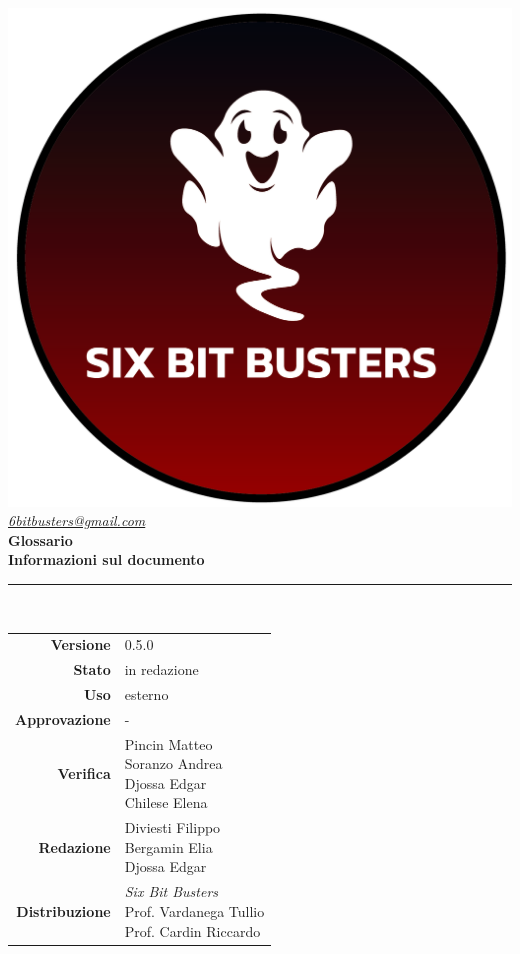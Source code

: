 \thispagestyle{empty}
\renewcommand{\arraystretch}{1.3}


\begin{titlepage}
	\begin{center}
		
	\includegraphics[scale = 0.7]{template/images/logo-circle.png}
	\\[1cm]
	\href{mailto:6bitbusters@gmail.com}		      	
	{\large{\textit{6bitbusters@gmail.com} } }\\[1cm]
	
	\Huge \textbf{Glossario} \\[1cm]

	\large \textbf{Informazioni sul documento} \\
	\rule{0.6\textwidth}{0.4pt}
	\\[0.5cm]
	\begin{tabular}{r|l}
		\textbf{Versione} & 0.5.0\\
		\textbf{Stato} & in redazione\\
		\textbf{Uso} & esterno\\                         
		\textbf{Approvazione} & -\\                      
		\textbf{Verifica} & \parbox[t]{5cm}{Pincin Matteo \\ Soranzo Andrea \\ Djossa Edgar \\Chilese Elena}\\                         
		\textbf{Redazione} & \parbox[t]{5cm}{Diviesti Filippo\\ Bergamin Elia \\ Djossa Edgar}\\
		\textbf{Distribuzione} & \parbox[t]{5cm}{ \textit{Six Bit Busters} \\ Prof. Vardanega Tullio 
	 \\ Prof. Cardin Riccardo}
	\end{tabular}	
	\\[1.2cm]


\end{center}
\end{titlepage}
